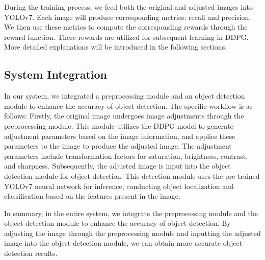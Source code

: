 \documentclass{PHlab-thesis}
\begin{document}
During the training process, we feed both the original and adjusted images into YOLOv7. Each image will produce corresponding metrics: recall and precision. We then use these metrics to compute the corresponding rewards through the reward function. These rewards are utilized for subsequent learning in DDPG. More detailed explanations will be introduced in the following sections.

\subsection{System Integration}
In our system, we integrated a preprocessing module and an object detection module to enhance the accuracy of object detection. The specific workflow is as follows: Firstly, the original image undergoes image adjustments through the preprocessing module. This module utilizes the DDPG model to generate adjustment parameters based on the image information, and applies these parameters to the image to produce the adjusted image. The adjustment parameters include transformation factors for saturation, brightness, contrast, and sharpness. Subsequently, the adjusted image is input into the object detection module for object detection. This detection module uses the pre-trained YOLOv7 neural network for inference, conducting object localization and classification based on the features present in the image.

In summary, in the entire system, we integrate the preprocessing module and the object detection module to enhance the accuracy of object detection. By adjusting the image through the preprocessing module and inputting the adjusted image into the object detection module, we can obtain more accurate object detection results. 
\end{document}
